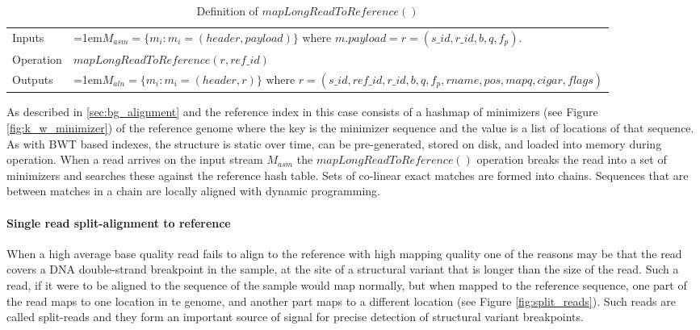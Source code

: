 \bgroup
\def\arraystretch{1.5}
\begin{table}[!ht]
    \caption{Definition of $mapLongReadToReference()$}
    \label{tab:op_map_long_read_to_reference}
    {\begin{tabular}{l|p{12cm}}
    \toprule
    Inputs & \hangindent=1em$M_{asm} = \{m_i: m_i = (header, payload)\}$ where $m.payload = r = (s\_id, r\_id, b, q, f_p)$. \\
    \cline{2-2}
    Operation & $mapLongReadToReference(r, ref\_id)$\\
    \cline{2-2}
    Outputs & \hangindent=1em$M_{aln} = \{m_i: m_i = (header, r)\} \text{ where } r = (s\_id, ref\_id, r\_id, b, q, f_p, rname, pos, mapq, cigar, flags)$\\
    \bottomrule
    \end{tabular}}
\end{table}
\egroup

As described in \ref{sec:bg_alignment} and \autocite{li2018minimap2} the reference index in this case consists of a hashmap of minimizers (see Figure \ref{fig:k_w_minimizer}) of the reference genome where the key is the minimizer sequence and the value is a list of locations of that sequence. As with BWT based indexes, the structure is static over time, can be pre-generated, stored on disk, and loaded into memory during operation. When a read arrives on the input stream $M_{asm}$ the $mapLongReadToReference()$ operation breaks the read into a set of minimizers and searches these against the reference hash table. Sets of co-linear exact matches are formed into chains. Sequences that are between matches in a chain are locally aligned with dynamic programming. 

\paragraph{Single read split-alignment to reference}
When a high average base quality read fails to align to the reference with high mapping quality one of the reasons may be that the read covers a DNA double-strand breakpoint in the sample, at the site of a structural variant that is longer than the size of the read. Such a read, if it were to be aligned to the sequence of the sample would map normally, but when mapped to the reference sequence, one part of the read maps to one location in te genome, and another part maps to a different location (see Figure \ref{fig:split_reads}). Such reads are called split-reads and they form an important source of signal for precise detection of structural variant breakpoints\autocites{rausch2012delly}{layer2014lumpy}.

